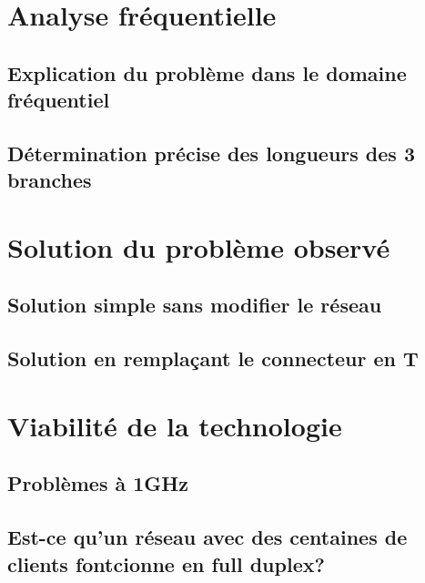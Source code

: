 \documentclass[DIV=15,paper=letter,titlepage=true,fontsize=12pt,headings=normal,captions=nooneline]{scrartcl}
\begin{document}
\section{Analyse fréquentielle}
\subsection{Explication du problème dans le domaine fréquentiel}

\FloatBarrier
\subsection{Détermination précise des longueurs des 3 branches}

\FloatBarrier


\section{Solution du problème observé}
\subsection{Solution simple sans modifier le réseau}

\FloatBarrier
\subsection{Solution en remplaçant le connecteur en T}

\FloatBarrier


\section{Viabilité de la technologie}
\subsection{Problèmes à 1GHz}

\FloatBarrier
\subsection{Est-ce qu'un réseau avec des centaines de clients fontcionne en full duplex?}

\FloatBarrier
\end{document}
